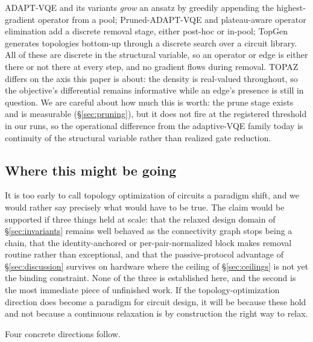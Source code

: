 \documentclass[twocolumn,aps,prl,superscriptaddress,showkeys]{revtex4-2}
\theoremstyle{plain}
\theoremstyle{definition}
\begin{document}
ADAPT-VQE and its variants \emph{grow} an ansatz by greedily appending the highest-gradient operator from a pool; Pruned-ADAPT-VQE and plateau-aware operator elimination add a discrete removal stage, either post-hoc or in-pool; TopGen generates topologies bottom-up through a discrete search over a circuit library. All of these are discrete in the structural variable, so an operator or edge is either there or not there at every step, and no gradient flows during removal. TOPAZ differs on the axis this paper is about: the density is real-valued throughout, so the objective's differential remains informative while an edge's presence is still in question. We are careful about how much this is worth: the prune stage exists and is measurable (\S\ref{sec:pruning}), but it does not fire at the registered threshold in our runs, so the operational difference from the adaptive-VQE family today is continuity of the structural variable rather than realized gate reduction.

\subsection{Where this might be going}

It is too early to call topology optimization of circuits a paradigm shift, and we would rather say precisely what would have to be true. The claim would be supported if three things held at scale: that the relaxed design domain of \S\ref{sec:invariants} remains well behaved as the connectivity graph stops being a chain, that the identity-anchored or per-pair-normalized block makes removal routine rather than exceptional, and that the passive-protocol advantage of \S\ref{sec:discussion} survives on hardware where the ceiling of \S\ref{sec:ceilings} is not yet the binding constraint. None of the three is established here, and the second is the most immediate piece of unfinished work. If the topology-optimization direction does become a paradigm for circuit design, it will be because these hold and not because a continuous relaxation is by construction the right way to relax.

Four concrete directions follow.
\end{document}
